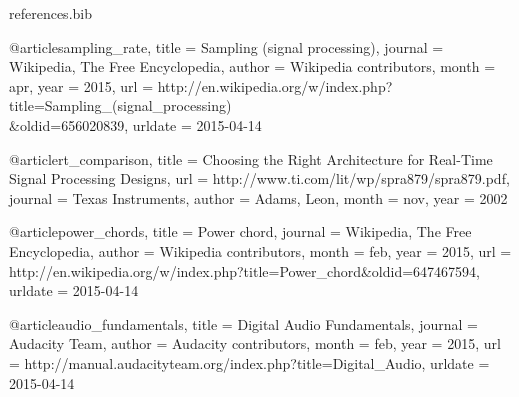 \begin{filecontents*}{references.bib}

@article{sampling_rate,
	title = {Sampling (signal processing)},
	journal = {Wikipedia, The Free Encyclopedia},
	author = {Wikipedia contributors},
	month = apr,
	year = {2015},
	url = {http://en.wikipedia.org/w/index.php?title=Sampling\_(signal\_processing)\\\&oldid=656020839},
	urldate = {2015-04-14}
}

@article{rt_comparison,
	title = {Choosing the Right Architecture for Real-Time Signal Processing Designs},
	url = {http://www.ti.com/lit/wp/spra879/spra879.pdf},
	journal = {Texas Instruments},
	author = {Adams, Leon},
	month = nov,
	year = {2002}
}

@article{power_chords,
	title = {Power chord},
	journal = {Wikipedia, The Free Encyclopedia},
	author = {Wikipedia contributors},
	month = feb,
	year = {2015},
	url = {http://en.wikipedia.org/w/index.php?title=Power\_chord\&oldid=647467594},
	urldate = {2015-04-14}
}

@article{audio_fundamentals,
	title = {Digital Audio Fundamentals},
	journal = {Audacity Team},
	author = {Audacity contributors},
	month = feb,
	year = {2015},
	url = {http://manual.audacityteam.org/index.php?title=Digital\_Audio},
	urldate = {2015-04-14}
}


\end{filecontents*}
